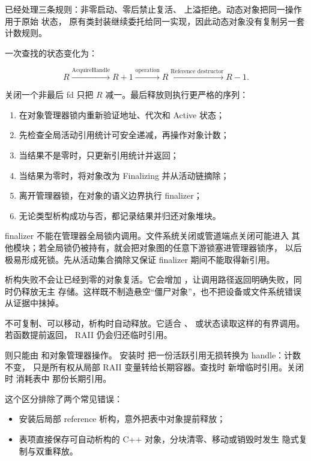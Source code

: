  已经处理三条规则：非零启动、零后禁止复活、
上溢拒绝。动态对象把同一操作用于原始  状态，
原有类封装继续委托给同一实现，因此动态对象没有复制另一套计数规则。

一次查找的状态变化为：

\[
  R \xrightarrow{\text{AcquireHandle}} R+1
    \xrightarrow{\text{operation}}
  R \xrightarrow{\text{Reference destructor}} R-1.
\]

关闭一个非最后 fd 只把 \(R\) 减一。最后释放则执行更严格的序列：

\begin{enumerate}
  \item 在对象管理器锁内重新验证地址、代次和 Active 状态；
  \item 先检查全局活动引用统计可安全递减，再操作对象计数；
  \item 当结果不是零时，只更新引用统计并返回；
  \item 当结果为零时，将对象改为 Finalizing 并从活动链摘除；
  \item 离开管理器锁，在对象的语义边界执行 finalizer；
  \item 无论类型析构成功与否，都记录结果并归还对象堆块。
\end{enumerate}

finalizer 不能在管理器全局锁内调用。文件系统关闭或管道端点关闭可能进入
其他模块；若全局锁仍被持有，就会把对象图的任意下游锁塞进管理器锁序，
以后极易形成死锁。先从活动集合摘除又保证 finalizer 期间不能取得新引用。

析构失败不会让已经到零的对象复活。它会增加
，让调用路径返回明确失败，同时仍释放无主
存储。这样既不制造悬空“僵尸对象”，也不把设备或文件系统错误从证据中抹掉。

 不可复制、可以移动，析构时自动释放。它适合
、 或状态读取这样的有界调用。若函数提前返回，
RAII 仍会归还临时引用。

 则只能由  和对象管理器操作。
安装时  把一份活跃引用无损转换为 handle：计数不变，
只是所有权从局部 RAII 变量转给长期容器。查找时
 新增临时引用。关闭时  消耗表中
那份长期引用。

这个区分排除了两个常见错误：

\begin{itemize}
  \item 安装后局部 reference 析构，意外把表中对象提前释放；
  \item 表项直接保存可自动析构的 C++ 对象，分块清零、移动或销毁时发生
        隐式复制与双重释放。
\end{itemize}

